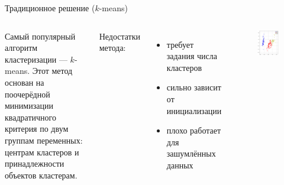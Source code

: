 \documentclass[aspectratio=169]{beamer}
\newcommand{\kmeans}{\mbox{$ k $-means}\xspace}
\begin{document}
	\begin{frame}{Традиционное решение (\kmeans)}
%				

       \begin{columns}
       	

   		\parbox{\linewidth}{
	       	Самый популярный алгоритм кластеризации --- \kmeans. Этот метод основан на поочерёдной минимизации квадратичного критерия по двум группам переменных: центрам кластеров и принадлежности объектов кластерам.
		}

		\vspace*{1\baselineskip} 
       	Недостатки метода:
       	\begin{itemize}
       		\item требует задания числа кластеров
       		\item сильно зависит от инициализации
       		\item плохо работает для зашумлённых данных
	    \end{itemize}
       	
       	\centering
       	\vspace{-.4cm}
       	\begin{figure}
       	\includegraphics[scale=0.45]{img/iris-kmeans-svd}

		\end{figure}
       \end{columns} 

	\end{frame}
\end{document}
